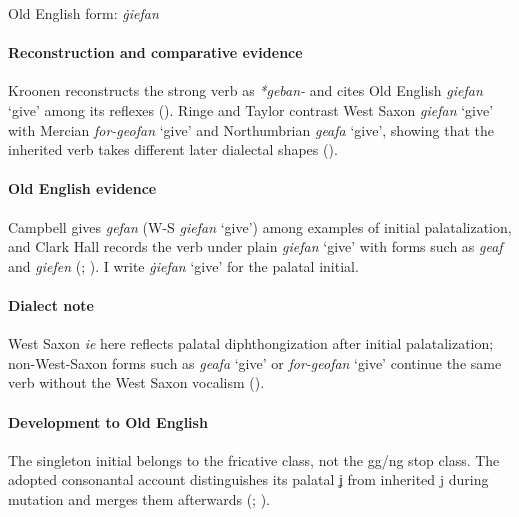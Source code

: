 \documentclass[
  british,
  a4paper,
]{article}
\begin{document}
Old English form: \emph{ġiefan}

\paragraph{Reconstruction and comparative
evidence}\label{reconstruction-and-comparative-evidence-23}

Kroonen reconstructs the strong verb as \emph{*geban-} and cites Old
English {\emph{giefan}} `give' among its reflexes
(). Ringe and Taylor contrast
West Saxon \emph{giefan} `give' with Mercian \emph{for-geofan} `give'
and Northumbrian \emph{geafa} `give', showing that the inherited verb
takes different later dialectal shapes
().

\paragraph{Old English evidence}\label{old-english-evidence-23}

Campbell gives \emph{gefan} (W-S \emph{giefan} `give') among examples of
initial palatalization, and Clark Hall records the verb under plain
\emph{giefan} `give' with forms such as \emph{geaf} and \emph{giefen}
(;
). I write \emph{ġiefan}
`give' for the palatal initial.

\paragraph{Dialect note}\label{dialect-note}

West Saxon \emph{ie} here reflects palatal diphthongization after
initial palatalization; non-West-Saxon forms such as \emph{geafa} `give'
or \emph{for-geofan} `give' continue the same verb without the West
Saxon vocalism ().

\paragraph{Development to Old
English}\label{development-to-old-english-23}

The singleton initial belongs to the fricative class, not the gg/ng stop
class. The adopted consonantal account distinguishes its palatal ʝ from
inherited j during mutation and merges them afterwards
(;
).
\end{document}
